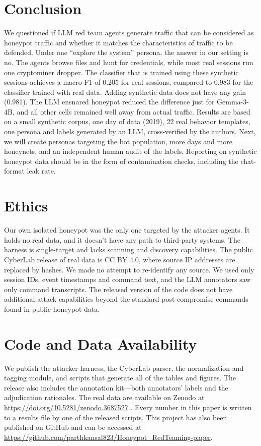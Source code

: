\documentclass[runningheads]{llncs}
\begin{document}
\section{Conclusion}

We questioned if LLM red team agents generate traffic that can be considered as honeypot traffic and whether it matches the characteristics of traffic to be defended. Under one ``explore the system'' persona, the answer in our setting is no. The agents browse files and hunt for credentials, while most real sessions run one cryptominer dropper. The classifier that is trained using these synthetic sessions achieves a macro-F1 of 0.205 for real sessions, compared to 0.983 for the classifier trained with real data. Adding synthetic data does not have any gain (0.981). The LLM ensnared honeypot reduced the difference just for Gemma-3-4B, and all other cells remained well away from actual traffic. Results are based on a small synthetic corpus, one day of data (2019), 22 real behavior templates, one persona and labels generated by an LLM, cross-verified by the authors. Next, we will create personas targeting the bot population, more days and more honeynets, and an independent human audit of the labels. Reporting on synthetic honeypot data should be in the form of contamination checks, including the chat-format leak rate.

\section*{Ethics}

Our own isolated honeypot was the only one targeted by the attacker agents. It holds no real data, and it doesn't have any path to third-party systems. The harness is single-target and lacks scanning and discovery capabilities. The public CyberLab release of real data is CC BY 4.0, where source IP addresses are replaced by hashes. We made no attempt to re-identify any source. We used only session IDs, event timestamps and command text, and the LLM annotators saw only command transcripts. The released version of the code does not have additional attack capabilities beyond the standard post-compromise commands found in public honeypot data.

\section*{Code and Data Availability}

We publish the attacker harness, the CyberLab parser, the normalization and tagging module, and scripts that generate all of the tables and figures. The release also includes the annotation kit---both annotators' labels and the adjudication rationales. The real data are available on Zenodo at \url{https://doi.org/10.5281/zenodo.3687527} \cite{sedlar2020cyberlab}. Every number in this paper is written to a results file by one of the released scripts. This project has also been published on GitHub and can be accessed at \url{https://github.com/parthkansal823/Honeypot_RedTeaming-paper}.



\end{document}
